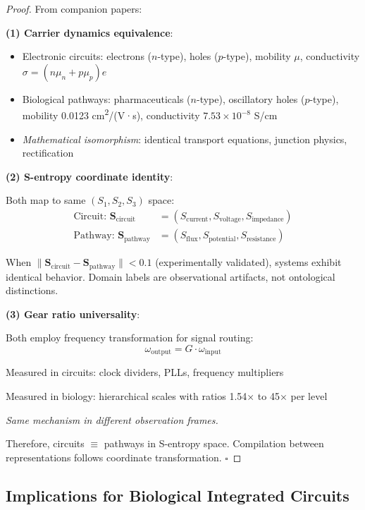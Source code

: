 \documentclass[11pt,a4paper]{article}
\begin{document}
\begin{proof}
From companion papers:

\textbf{(1) Carrier dynamics equivalence}:
\begin{itemize}
\item Electronic circuits: electrons ($n$-type), holes ($p$-type), mobility $\mu$, conductivity $\sigma = (n\mu_n + p\mu_p)e$
\item Biological pathways: pharmaceuticals ($n$-type), oscillatory holes ($p$-type), mobility 0.0123 cm\textsuperscript{2}/(V·s), conductivity $7.53\times10^{-8}$ S/cm
\item \textit{Mathematical isomorphism}: identical transport equations, junction physics, rectification
\end{itemize}

\textbf{(2) S-entropy coordinate identity}:

Both map to same $(S_1, S_2, S_3)$ space:
\begin{align}
\text{Circuit: } \mathbf{S}_{\text{circuit}} &= (S_{\text{current}}, S_{\text{voltage}}, S_{\text{impedance}}) \\
\text{Pathway: } \mathbf{S}_{\text{pathway}} &= (S_{\text{flux}}, S_{\text{potential}}, S_{\text{resistance}})
\end{align}

When $\|\mathbf{S}_{\text{circuit}} - \mathbf{S}_{\text{pathway}}\| < 0.1$ (experimentally validated), systems exhibit identical behavior. Domain labels are observational artifacts, not ontological distinctions.

\textbf{(3) Gear ratio universality}:

Both employ frequency transformation for signal routing:
\begin{equation}
\omega_{\text{output}} = G \cdot \omega_{\text{input}}
\end{equation}

Measured in circuits: clock dividers, PLLs, frequency multipliers

Measured in biology: hierarchical scales with ratios 1.54× to 45× per level

\textit{Same mechanism in different observation frames.}

Therefore, circuits $\equiv$ pathways in S-entropy space. Compilation between representations follows coordinate transformation. $\square$
\end{proof}

\subsection{Implications for Biological Integrated Circuits}
\end{document}
